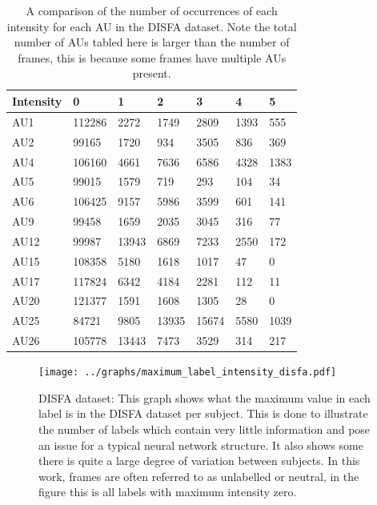     \begin{table}[h!]
    \centering

    \begin{tabular}{lllllll}
    \hline
    Intensity & 0      & 1     & 2     & 3     & 4    & 5    \\ \hline
    AU1       & 112286 & 2272  & 1749  & 2809  & 1393 & 555  \\
    AU2       & 99165  & 1720  & 934   & 3505  & 836  & 369  \\
    AU4       & 106160 & 4661  & 7636  & 6586  & 4328 & 1383 \\
    AU5       & 99015  & 1579  & 719   & 293   & 104  & 34   \\
    AU6       & 106425 & 9157  & 5986  & 3599  & 601  & 141  \\
    AU9       & 99458  & 1659  & 2035  & 3045  & 316  & 77   \\
    AU12      & 99987  & 13943 & 6869  & 7233  & 2550 & 172  \\
    AU15      & 108358 & 5180  & 1618  & 1017  & 47   & 0    \\
    AU17      & 117824 & 6342  & 4184  & 2281  & 112  & 11   \\
    AU20      & 121377 & 1591  & 1608  & 1305  & 28   & 0    \\
    AU25      & 84721  & 9805  & 13935 & 15674 & 5580 & 1039 \\
    AU26      & 105778 & 13443 & 7473  & 3529  & 314  & 217  \\ \hline
    \end{tabular}
    \caption{A comparison of the number of occurrences of each intensity for each AU in the DISFA dataset. Note the total number
    of AUs tabled here is larger than the number of frames, this is because some frames have multiple AUs present.} \label{compau}
    \end{table}


    \begin{figure}[h!]
      \texttt{[image: ../graphs/maximum\_label\_intensity\_disfa.pdf]}
      \caption{DISFA dataset: This graph shows what the maximum value in each label is in the DISFA dataset per subject. This
      is done to illustrate the number of labels which contain very little information
      and pose an issue for a typical neural network structure. It also shows some there
      is quite a large degree of variation between subjects. In this work, frames are often referred to as unlabelled or neutral,
      in the figure this is all labels with maximum intensity zero.}\label{disfastats}
    \end{figure}

